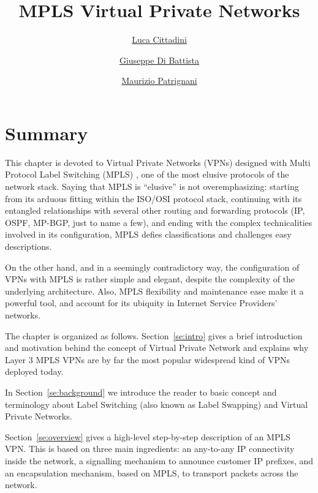 \documentclass{article}
\begin{document}
\title{MPLS Virtual Private Networks}

\author{\href{http://www.dia.uniroma3.it/~compunet/www/view/person.php?id=cittadini}{Luca Cittadini} \and \href{http://www.dia.uniroma3.it/people/gdb/}{Giuseppe Di Battista} \and \href{http://www.dia.uniroma3.it/~patrigna/}{Maurizio Patrignani}}

\date{}

\copyrightstatement

\pagestyle{empty}

\maketitle

\thispagestyle{empty}

\section*{Summary}
This chapter is devoted to Virtual Private Networks (VPNs) designed with Multi 
Protocol Label Switching (MPLS) \cite{rfc4364,rfc3031,rfc5036}, one of the most 
elusive protocols of the network stack. Saying that MPLS is ``elusive'' is not 
overemphasizing: starting from its arduous fitting within the ISO/OSI protocol 
stack, continuing with its entangled relationships with several other routing 
and forwarding protocols (IP, OSPF, MP-BGP, just to name a few), and ending with 
the complex technicalities involved in its configuration, MPLS defies 
classifications and challenges easy descriptions. 

On the other hand, and in a seemingly contradictory way, the configuration of 
VPNs with MPLS is rather simple and elegant, despite the complexity of the 
underlying architecture. Also, MPLS flexibility and maintenance ease 
make it a powerful tool, and account for its ubiquity in Internet Service 
Providers' networks.

The chapter is organized as follows. Section~\ref{se:intro} gives a brief introduction and
motivation behind the concept of Virtual Private Network and explains why Layer 3 MPLS VPNs
are by far the most popular widespread kind of VPNs deployed today.

In Section~\ref{se:background} we introduce the reader to basic concept and terminology
about Label Switching (also known as Label Swapping) and Virtual Private Networks.

Section~\ref{se:overview} gives a high-level step-by-step description of an MPLS VPN. This is based on three main ingredients: an any-to-any IP connectivity inside the
network, a signalling mechanism to announce customer IP prefixes, and an encapsulation
mechanism, based on MPLS, to transport packets across the network.
\end{document}
